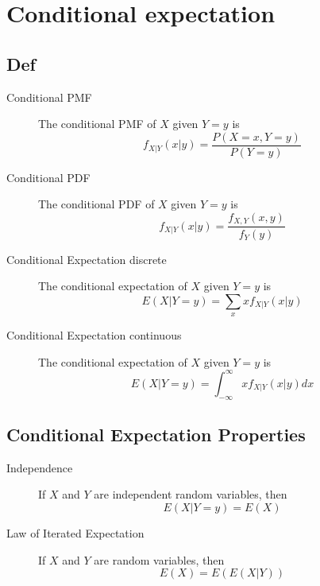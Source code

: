 \section{Conditional expectation}
\label{sec:conditional_distribution}
\subsection*{Def}
\begin{description}
    \item[Conditional PMF] The conditional PMF of $X$ given $Y = y$ is
    \[f_{X|Y}(x|y) = \frac{P(X = x, Y = y)}{P(Y = y)}\]
    \item[Conditional PDF] The conditional PDF of $X$ given $Y = y$ is
    \[f_{X|Y}(x|y) = \frac{f_{X,Y}(x,y)}{f_Y(y)}\]
    \item[Conditional Expectation discrete] The conditional expectation of $X$ given $Y = y$ is
    \[E(X|Y = y) = \sum_{x}xf_{X|Y}(x|y)\]
    \item[Conditional Expectation continuous] The conditional expectation of $X$ given $Y = y$ is
    \[E(X|Y = y) = \int_{-\infty}^{\infty}xf_{X|Y}(x|y)dx\]
\end{description}
\subsection*{Conditional Expectation Properties}
\begin{description}
    \item[Independence] If $X$ and $Y$ are independent random variables, then
    \[E(X|Y = y) = E(X)\]
    \item[Law of Iterated Expectation] If $X$ and $Y$ are random variables, then
    \[E(X) = E(E(X|Y))\]
\end{description}